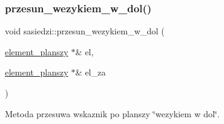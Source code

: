 \subsubsection{\texorpdfstring{przesun\+\_\+wezykiem\+\_\+w\+\_\+dol()}{przesun\_wezykiem\_w\_dol()}}
{\footnotesize\ttfamily void sasiedzi\+::przesun\+\_\+wezykiem\+\_\+w\+\_\+dol (\begin{DoxyParamCaption}\item[{\mbox{\hyperlink{classelement__planszy}{element\+\_\+planszy}} $\ast$\&}]{el,  }\item[{\mbox{\hyperlink{classelement__planszy}{element\+\_\+planszy}} $\ast$\&}]{el\+\_\+za }\end{DoxyParamCaption})}

Metoda przesuwa wskaznik po planszy \char`\"{}wezykiem w dol\char`\"{}.

